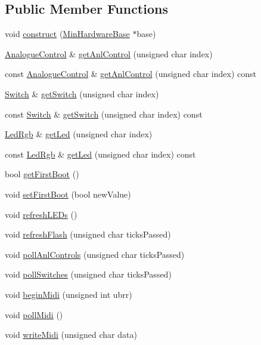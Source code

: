 \subsection*{Public Member Functions}
\begin{DoxyCompactItemize}
\item 
void \hyperlink{class_min_hardware_a39382d7c1fcdcec2858c01c05d4c35aa}{construct} (\hyperlink{class_min_hardware_base}{Min\+Hardware\+Base} $\ast$base)
\item 
\hyperlink{class_analogue_control}{Analogue\+Control} \& \hyperlink{class_min_hardware_a6960d088af0e6dabdd93d943a31906e3}{get\+Anl\+Control} (unsigned char index)
\item 
const \hyperlink{class_analogue_control}{Analogue\+Control} \& \hyperlink{class_min_hardware_a795eea6c8e488f0ef2700422b734f4f7}{get\+Anl\+Control} (unsigned char index) const
\item 
\hyperlink{class_switch}{Switch} \& \hyperlink{class_min_hardware_a7e3fdfca776cd833f4ab859c25232c9c}{get\+Switch} (unsigned char index)
\item 
const \hyperlink{class_switch}{Switch} \& \hyperlink{class_min_hardware_a874ff2353b74b2fefadd2f9322995617}{get\+Switch} (unsigned char index) const
\item 
\hyperlink{class_led_rgb}{Led\+Rgb} \& \hyperlink{class_min_hardware_a1401ae874f57cc5ce31032c8eea57fbd}{get\+Led} (unsigned char index)
\item 
const \hyperlink{class_led_rgb}{Led\+Rgb} \& \hyperlink{class_min_hardware_af0f53594d24df7d75360ccccd0f582d3}{get\+Led} (unsigned char index) const
\item 
bool \hyperlink{class_min_hardware_a8227e23999bf74110a124c889c80759e}{get\+First\+Boot} ()
\item 
void \hyperlink{class_min_hardware_a84cd3aa52662d5f6e599035a812894f9}{set\+First\+Boot} (bool new\+Value)
\item 
void \hyperlink{class_min_hardware_a84e0d11e73681ef8b7a7e90628b827ab}{refresh\+L\+E\+Ds} ()
\item 
void \hyperlink{class_min_hardware_a22017d021942bf72850a338b1522d5c2}{refresh\+Flash} (unsigned char ticks\+Passed)
\item 
void \hyperlink{class_min_hardware_afa6cdaaab625ffd44c733c6ff9e29f4d}{poll\+Anl\+Controls} (unsigned char ticks\+Passed)
\item 
void \hyperlink{class_min_hardware_a135650ade19c661a9e20f0a410722a10}{poll\+Switches} (unsigned char ticks\+Passed)
\item 
void \hyperlink{class_min_hardware_af4ce30a68a24c15d0149f2e65d72cc33}{begin\+Midi} (unsigned int ubrr)
\item 
void \hyperlink{class_min_hardware_a4978945a745e4c2690e05789eff52976}{poll\+Midi} ()
\item 
void \hyperlink{class_min_hardware_a9a29bee58534914c24171d362e78bd2a}{write\+Midi} (unsigned char data)
\end{DoxyCompactItemize}
